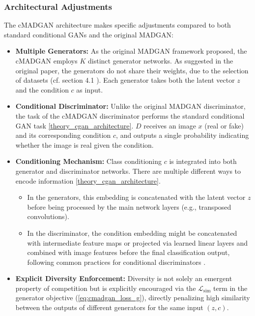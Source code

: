 \subsubsection{Architectural Adjustments}
\label{theory_cmadgan_architecture}

The cMADGAN architecture makes specific adjustments compared to both standard conditional GANs and the original MADGAN:

\begin{itemize}
    \item \textbf{Multiple Generators:}
    As the original MADGAN framework proposed, the cMADGAN employs \(K\) distinct generator networks. As suggested in the original paper, the generators do not share their weights, due to the selection of datasets (cf. section 4.1 \cite{ghosh2018madgan}). Each generator takes both the latent vector \( z \) and the condition \( c \) as input.
    \item \textbf{Conditional Discriminator:}
    Unlike the original MADGAN discriminator, the task of the cMADGAN discriminator performs the standard conditional GAN task \ref{theory_cgan_architecture}. \(D\) receives an image \( x \) (real or fake) and its corresponding condition \( c \), and outputs a single probability indicating whether the image is real given the condition.
    \item \textbf{Conditioning Mechanism:} Class conditioning \( c \) is integrated into both generator and discriminator networks. There are multiple different ways to encode information \ref{theory_cgan_architecture}.
        \begin{itemize}
            \item In the generators, this embedding is concatenated with the latent vector \( z \) before being processed by the main network layers (e.g., transposed convolutions).
            \item In the discriminator, the condition embedding might be concatenated with intermediate feature maps or projected via learned linear layers and combined with image features before the final classification output, following common practices for conditional discriminators \cite{mirza2014conditionalgenerativeadversarialnets}.
        \end{itemize}
    \item \textbf{Explicit Diversity Enforcement:} Diversity is not solely an emergent property of competition but is explicitly encouraged via the \( \mathcal{L}_{\text{sim}} \) term in the generator objective (\ref{eq:cmadgan_loss_g}), directly penalizing high similarity between the outputs of different generators for the same input \( (z, c) \).
\end{itemize}

